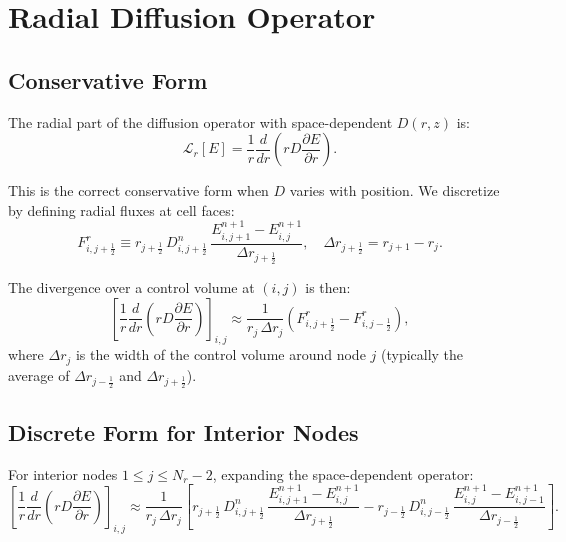\documentclass[12pt,oneside]{article}
\begin{document}
\section{Radial Diffusion Operator}

\subsection{Conservative Form}

The radial part of the diffusion operator with space-dependent $D(r,z)$ is:
\begin{equation}
\mathcal{L}_r[E]
=
\frac{1}{r}\frac{d}{dr}\left(rD\frac{\partial E}{\partial r}\right).
\end{equation}

This is the correct conservative form when $D$ varies with position. We discretize by defining radial fluxes at cell faces:
\begin{equation}
F^{r}_{i,j+\frac12}
\equiv
r_{j+\frac12}\,D^n_{i,j+\frac12}\,\frac{E^{n+1}_{i,j+1} - E^{n+1}_{i,j}}{\Delta r_{j+\frac12}},
\quad
\Delta r_{j+\frac12} = r_{j+1} - r_j.
\end{equation}

The divergence over a control volume at $(i,j)$ is then:
\begin{equation}
\left[\frac{1}{r}\frac{d}{dr}\left(rD\frac{\partial E}{\partial r}\right)\right]_{i,j}
\approx
\frac{1}{r_j \,\Delta r_j}\left(F^{r}_{i,j+\frac12} - F^{r}_{i,j-\frac12}\right),
\end{equation}
where $\Delta r_j$ is the width of the control volume around node $j$ (typically the average of $\Delta r_{j-\frac12}$ and $\Delta r_{j+\frac12}$).

\subsection{Discrete Form for Interior Nodes}

For interior nodes $1 \le j \le N_r - 2$, expanding the space-dependent operator:
\begin{equation}
\left[\frac{1}{r}\frac{d}{dr}\left(rD\frac{\partial E}{\partial r}\right)\right]_{i,j}
\approx
\frac{1}{r_j \,\Delta r_j}
\left[
r_{j+\frac12}\,D^n_{i,j+\frac12}\,\frac{E^{n+1}_{i,j+1} - E^{n+1}_{i,j}}{\Delta r_{j+\frac12}}
-
r_{j-\frac12}\,D^n_{i,j-\frac12}\,\frac{E^{n+1}_{i,j} - E^{n+1}_{i,j-1}}{\Delta r_{j-\frac12}}
\right].
\end{equation}
\end{document}
